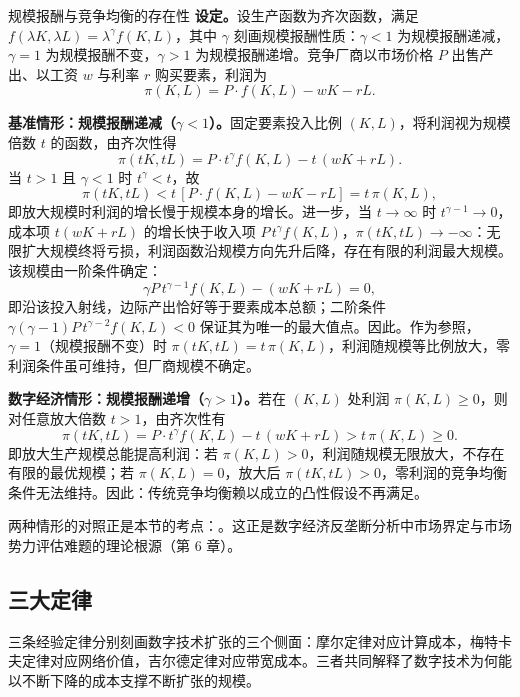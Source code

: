 \begin{derivation}{规模报酬与竞争均衡的存在性}{}
\textbf{设定。}设生产函数为齐次函数，满足 $f(\lambda K, \lambda L) = \lambda^{\gamma} f(K,L)$，其中 $\gamma$ 刻画规模报酬性质：$\gamma<1$ 为规模报酬递减，$\gamma=1$ 为规模报酬不变，$\gamma>1$ 为规模报酬递增。竞争厂商以市场价格 $P$ 出售产出、以工资 $w$ 与利率 $r$ 购买要素，利润为
\[
\pi(K,L) = P \cdot f(K,L) - wK - rL.
\]

\textbf{基准情形：规模报酬递减（$\gamma<1$）。}固定要素投入比例 $(K,L)$，将利润视为规模倍数 $t$ 的函数，由齐次性得
\[
\pi(tK, tL) = P \cdot t^{\gamma} f(K,L) - t\,(wK + rL).
\]
当 $t>1$ 且 $\gamma<1$ 时 $t^{\gamma}<t$，故
\[
\pi(tK, tL) < t\,[P \cdot f(K,L) - wK - rL] = t\,\pi(K,L),
\]
即放大规模时利润的增长慢于规模本身的增长。进一步，当 $t\to\infty$ 时 $t^{\gamma-1}\to 0$，成本项 $t(wK+rL)$ 的增长快于收入项 $P\,t^{\gamma} f(K,L)$，$\pi(tK,tL)\to-\infty$：无限扩大规模终将亏损，利润函数沿规模方向先升后降，存在有限的利润最大规模。该规模由一阶条件确定：
\[
\gamma P\,t^{\gamma-1}f(K,L) - (wK+rL) = 0,
\]
即沿该投入射线，边际产出恰好等于要素成本总额；二阶条件 $\gamma(\gamma-1)P\,t^{\gamma-2}f(K,L) < 0$ 保证其为唯一的最大值点。因此。作为参照，$\gamma=1$（规模报酬不变）时 $\pi(tK,tL) = t\,\pi(K,L)$，利润随规模等比例放大，零利润条件虽可维持，但厂商规模不确定。

\textbf{数字经济情形：规模报酬递增（$\gamma>1$）。}若在 $(K,L)$ 处利润 $\pi(K,L) \ge 0$，则对任意放大倍数 $t>1$，由齐次性有
\[
\pi(tK, tL) = P \cdot t^{\gamma} f(K,L) - t\,(wK + rL) > t\,\pi(K,L) \ge 0.
\]
即放大生产规模总能提高利润：若 $\pi(K,L) > 0$，利润随规模无限放大，不存在有限的最优规模；若 $\pi(K,L) = 0$，放大后 $\pi(tK,tL) > 0$，零利润的竞争均衡条件无法维持。因此：传统竞争均衡赖以成立的凸性假设不再满足。
\end{derivation}

两种情形的对照正是本节的考点：。这正是数字经济反垄断分析中市场界定与市场势力评估难题的理论根源（第 6 章）。

\subsection{三大定律}

三条经验定律分别刻画数字技术扩张的三个侧面：摩尔定律对应计算成本，梅特卡夫定律对应网络价值，吉尔德定律对应带宽成本。三者共同解释了数字技术为何能以不断下降的成本支撑不断扩张的规模。

